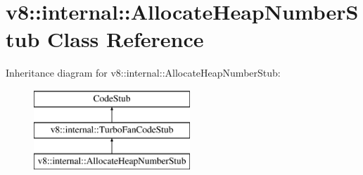 \hypertarget{classv8_1_1internal_1_1_allocate_heap_number_stub}{}\section{v8\+:\+:internal\+:\+:Allocate\+Heap\+Number\+Stub Class Reference}
\label{classv8_1_1internal_1_1_allocate_heap_number_stub}
Inheritance diagram for v8\+:\+:internal\+:\+:Allocate\+Heap\+Number\+Stub\+:\begin{figure}[H]
\begin{center}
\leavevmode
\includegraphics[height=3.000000cm]{classv8_1_1internal_1_1_allocate_heap_number_stub}
\end{center}
\end{figure}
